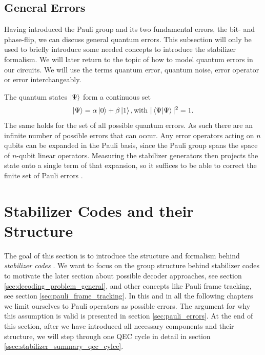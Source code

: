 \subsection{General Errors}

Having introduced the Pauli group and its two fundamental errors, the bit- and phase-flip, we can discuss general quantum errors.
This subsection will only be used to briefly introduce some needed concepts to introduce the stabilizer formalism. We will later return to the topic of how to model quantum errors in our circuits.
We will use the terms quantum error, quantum noise, error operator or error interchangeably. 

The quantum states $\ket{\Psi}$ form a continuous set 
\begin{equation}
    \ket{\Psi} = \alpha \ket{0} + \beta\ket{1}, \text{with }|\braket{\Psi|\Psi}|^2 = 1.
\end{equation}
The same holds for the set of all possible quantum errors.
As such there are an infinite number of possible errors that can occur.
Any error operators acting on $n$ qubits can be expanded in the Pauli basis, since the Pauli group spans the space of $n$-qubit linear operators. 
Measuring the stabilizer generators then projects the state onto a single term of that expansion, so it suffices to be able to correct the finite set of Pauli errors \cite{knill_laflamme}.



\section{Stabilizer Codes and their Structure}\label{sec:stabilizer_formalism}

The goal of this section is to introduce the structure and formalism behind \emph{stabilizer codes} \cite{gottesmann_book,gottesmann_thesis,terhal_qec_formalism}.
We want to focus on the group structure behind stabilizer codes to motivate the later section about possible decoder approaches, see section \ref{sec:decoding_problem_general}, 
and other concepts like Pauli frame tracking, see section \ref{sec:pauli_frame_tracking}. 
In this and in all the following chapters we limit ourselves to Pauli operators as possible errors. 
The argument for why this assumption is valid is presented in section \ref{sec:pauli_errors}.
At the end of this section, after we have introduced all necessary components and their structure, we will step through one QEC cycle in detail in section \ref{ssec:stabilizer_summary_qec_cylce}.


